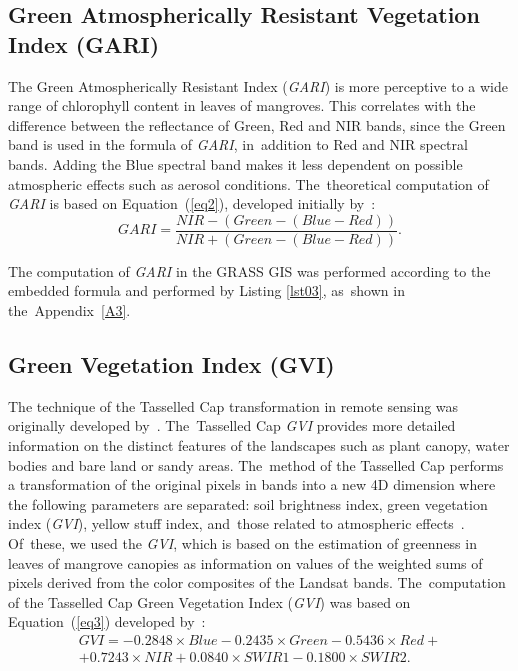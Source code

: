 \documentclass[jmse,article,accept,pdftex,moreauthors]{Definitions/mdpi}
\begin{document}
\subsection{Green Atmospherically Resistant Vegetation Index (GARI)}

The Green Atmospherically Resistant Index (\emph{GARI}) is more perceptive to a wide range of chlorophyll content in leaves of mangroves. This correlates with the difference between the reflectance of Green, Red and NIR bands, since the Green band is used in the formula of \emph{GARI}, in~addition to Red and NIR spectral bands. Adding the Blue spectral band makes it less dependent on possible atmospheric effects such as aerosol conditions. The~theoretical computation of \emph{GARI} is based on Equation~(\ref{eq2}), developed initially by~\cite{GITELSON1996289}:
\begin{equation}\label{eq2}
	GARI = \frac{NIR - (Green - (Blue - Red))}{NIR + (Green - (Blue - Red))}.
\end{equation} 

The computation of \emph{GARI} in the GRASS GIS was performed according to the embedded formula and performed by Listing \ref{lst03}, as~shown in the~Appendix~\ref{A3}. %

\subsection{Green Vegetation Index (GVI)}

The technique of the Tasselled Cap transformation in remote sensing was originally developed by~\cite{KauthThomas}. The~Tasselled Cap \emph{GVI} provides more detailed information on the distinct features of the landscapes such as plant canopy, water bodies and bare land or sandy areas. The~method of the Tasselled Cap performs a transformation of the original pixels in bands into a new 4D dimension where the following parameters are separated: soil brightness index, green vegetation index (\emph{GVI}), yellow stuff index, and~those related to atmospheric effects~\cite{Huang2002}. Of~these, we used the \emph{GVI}, which is based on the estimation of greenness in leaves of mangrove canopies as information on values of the weighted sums of pixels derived from the color composites of the Landsat bands. The~computation of the Tasselled Cap Green Vegetation Index (\emph{GVI}) was based on Equation~(\ref{eq3}) developed by~\cite{4157507}:
\begin{equation}\label{eq3}
\begin{split}
	GVI = -0.2848 \times Blue - 0.2435 \times Green - 0.5436 \times Red + \\
	+ 0.7243 \times NIR + 0.0840 \times SWIR1- 0.1800 \times SWIR2.
\end{split}
\end{equation}
\end{document}

